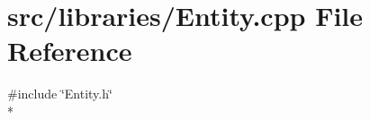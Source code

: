 \section{src/libraries/\-Entity.cpp File Reference}
\label{_entity_8cpp}
{\ttfamily \#include \char`\"{}Entity.\-h\char`\"{}}\\*
